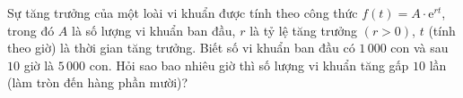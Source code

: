 \begin{bt}%

	Sự tăng trưởng của một loài vi khuẩn được tính theo công thức $f(t)=A\cdot \mathrm{e}^{rt}$, trong đó $A$ là số lượng vi khuẩn ban đầu, $r$ là tỷ lệ tăng trưởng $(r>0)$, $t$ (tính theo giờ) là thời gian tăng trưởng. Biết số vi khuẩn ban đầu có $1\,000$ con và sau $10$ giờ là $5\,000$ con. Hỏi sao bao nhiêu giờ thì số lượng vi khuẩn tăng gấp $10$ lần (làm tròn đến hàng phần mười)?
\end{bt}

